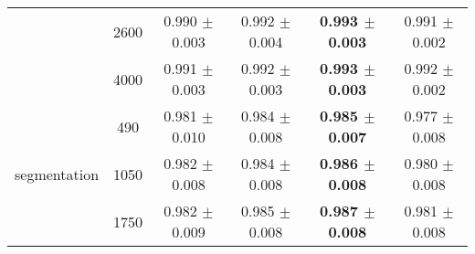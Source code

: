 \documentclass{standalone}
\begin{document}
\begin{table*}[t]
\begin{small}
\begin{sc}
{\begin{tabular}{|l|c|c|c|c|c|}
	& 2600			& 0.990 $\pm$ 0.003 & 0.992 $\pm$ 0.004 & \textbf{0.993 $\pm$ 0.003} & 0.991 $\pm$ 0.002 \\
	& 4000			& 0.991 $\pm$ 0.003 & 0.992 $\pm$ 0.003 & \textbf{0.993 $\pm$ 0.003} & 0.992 $\pm$ 0.002 \\
\hline
\multirow{3}{*}{segmentation}
	& 490			& 	0.981 $\pm$ 0.010 & 0.984 $\pm$ 0.008 & \textbf{0.985 $\pm$ 0.007} & 0.977 $\pm$ 0.008 \\
	& 1050			& 	0.982 $\pm$ 0.008 & 0.984 $\pm$ 0.008 & \textbf{0.986 $\pm$ 0.008} & 0.980 $\pm$ 0.008 \\
	& 1750			& 	0.982 $\pm$ 0.009 & 0.985 $\pm$ 0.008 & \textbf{0.987 $\pm$ 0.008} & 0.981 $\pm$ 0.008 \\
\hline
\end{tabular}
\vskip -0.1in
} %
\end{sc}
\end{small}
\end{table*}
	
\end{document}
